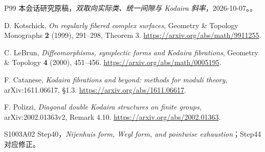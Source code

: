 \documentclass[UTF8,11pt,openany,oneside,fontset=none]{ctexbook}
\begin{document}
\begin{thebibliography}{P99}
 本会话研究原稿，\emph{双取向实际类、统一间隙与 Kodaira 斜率}，2026-10-07。。

 D. Kotschick, \emph{On regularly fibered complex surfaces}, Geometry \& Topology Monographs \textbf{2} (1999), 291--298, Theorem 3. \url{https://arxiv.org/abs/math/9911255}.

 C. LeBrun, \emph{Diffeomorphisms, symplectic forms and Kodaira fibrations}, Geometry \& Topology \textbf{4} (2000), 451--456. \url{https://arxiv.org/abs/math/0005195}.

 F. Catanese, \emph{Kodaira fibrations and beyond: methods for moduli theory}, arXiv:1611.06617, §1.3. \url{https://arxiv.org/abs/1611.06617}.

 F. Polizzi, \emph{Diagonal double Kodaira structures on finite groups}, arXiv:2002.01363v2, Remark 4.10. \url{https://arxiv.org/abs/2002.01363}.

 S1003A02 Step40，\emph{Nijenhuis form, Weyl form, and pointwise exhaustion}；Step44 对应修正。

\end{thebibliography}
\end{document}

